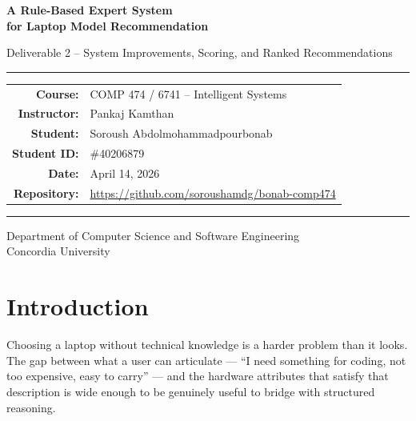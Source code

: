 \documentclass[12pt,a4paper]{article}
\begin{document}
\begin{titlepage}
\centering
\vspace*{2cm}

{\LARGE\bfseries A Rule-Based Expert System\\[0.4em]for Laptop Model Recommendation\par}

\vspace{1.2cm}
{\large Deliverable 2 -- System Improvements, Scoring, and Ranked Recommendations\par}

\vspace{2cm}
\hrule
\vspace{0.8cm}

\begin{tabular}{rl}
\textbf{Course:}      & COMP 474 / 6741 -- Intelligent Systems \\[0.4em]
\textbf{Instructor:}  & Pankaj Kamthan \\[0.4em]
\textbf{Student:}     & Soroush Abdolmohammadpourbonab \\[0.4em]
\textbf{Student ID:}  & \#40206879 \\[0.4em]
\textbf{Date:}        & April 14, 2026 \\[0.4em]
\textbf{Repository:}  & \url{https://github.com/soroushamdg/bonab-comp474} \\
\end{tabular}

\vspace{0.8cm}
\hrule

\vfill
{\small Department of Computer Science and Software Engineering\\
Concordia University}
\end{titlepage}

\tableofcontents
\newpage

\section{Introduction}

Choosing a laptop without technical knowledge is a harder problem than it looks. The gap between what a user can articulate --- ``I need something for coding, not too expensive, easy to carry'' --- and the hardware attributes that satisfy that description is wide enough to be genuinely useful to bridge with structured reasoning.
\end{document}
